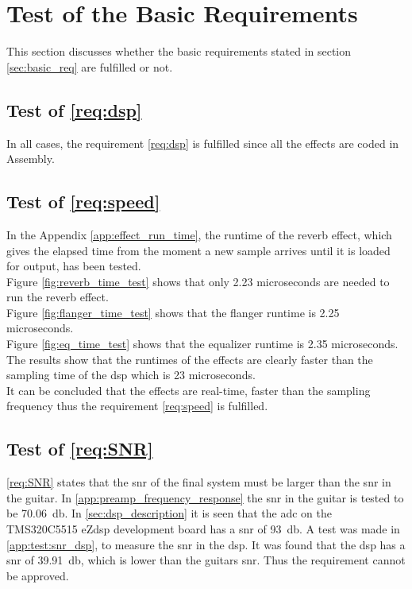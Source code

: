\section{Test of the Basic Requirements}
This section discusses whether the basic requirements stated in section \ref{sec:basic_req} are fulfilled or not. 

\subsection{Test of  \autoref{req:dsp}}
In all cases, the requirement \ref{req:dsp} is fulfilled since all the effects are coded in Assembly.


\subsection{Test of  \autoref{req:speed}}
In the Appendix \ref{app:effect_run_time}, the runtime of the reverb effect, which gives the elapsed time from the moment a new sample arrives until it is loaded for output, has been tested. \\
Figure \ref{fig:reverb_time_test} shows that only 2.23 microseconds are needed to run the \gls{reverb} effect. \\
Figure \ref{fig:flanger_time_test} shows that the flanger runtime is 2.25 microseconds. \\
Figure \ref{fig:eq_time_test} shows that the equalizer runtime is 2.35 microseconds. \\
The results show that the runtimes of the effects are clearly faster than the sampling time of the \gls{dsp} which is 23 microseconds. \\
It can be concluded that the effects are real-time, faster than the sampling frequency thus the requirement \ref{req:speed} is fulfilled. \\

\subsection{Test of \autoref{req:SNR}}
\autoref{req:SNR} states that the \gls{snr} of the final system must be larger than the \gls{snr} in the guitar. In \autoref{app:preamp_frequency_response} the \gls{snr} in the guitar is tested to be \SI{70.06}{\decibel}. In \autoref{sec:dsp_description} it is seen that the \gls{adc} on the TMS320C5515 eZdsp development board has a \gls{snr} of \SI{93}{\decibel}. A test was made in \autoref{app:test:snr_dsp}, to measure the \gls{snr} in the \gls{dsp}. It was found that the \gls{dsp} has a \gls{snr} of \SI{39.91}{\decibel}, which is lower than the guitars \gls{snr}. Thus the requirement cannot be approved. 

